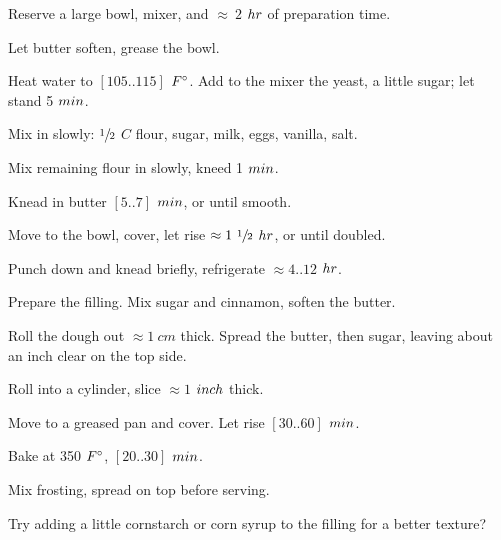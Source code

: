 \begin{preparation}
\item Reserve a large bowl, mixer, and $\approx~2$ $\hour$ of preparation time.
\item Let butter soften, grease the bowl.
\item Heat water to $[105 .. 115]$ $\Fahrenheit$.
	Add to the mixer the yeast, a little sugar; let stand 5 $\minute$.
\item Mix in slowly: $\onehalf$ $C$ flour, sugar, milk, eggs, vanilla, salt.
\item Mix remaining flour in slowly, kneed 1 $\minute$.
\item Knead in butter $[5 .. 7]$ $\minute$, or until smooth.
\item Move to the bowl, cover, let rise $\approx1~\onehalf$ $\hour$, or until doubled.
\item Punch down and knead briefly, refrigerate $\approx4..12$ $\hour$.
\item Prepare the filling.
	Mix sugar and cinnamon, soften the butter.
\item Roll the dough out $\approx1~cm$ thick.
	Spread the butter, then sugar, leaving about an inch clear on the top side.
\item Roll into a cylinder, slice $\approx1$ $\inch$ thick.
\item Move to a greased pan and cover.
	Let rise $[30..60]$ $\minute$.
\item Bake at 350 $\Fahrenheit$, $[20..30]$ $\minute$.
\item Mix frosting, spread on top before serving.
\end{preparation}

\begin{experiments}
\item Try adding a little cornstarch or corn syrup to the filling for a better texture?
\end{experiments}

\recipeend%
